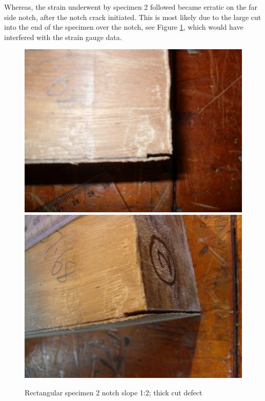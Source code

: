 \documentclass[11pt,a4paper]{article}
\numberwithin{equation}{subsection}
\begin{document}
\noindent
Whereas, the strain underwent by specimen 2 followed became erratic on the far side notch, after the notch crack initiated. This is most likely due to the large cut into the end of the specimen over the notch, see Figure \ref{fig:Rect_Cut}, which would have interfered with the strain gauge data. 

\vspace*{\baselineskip}

\begin{figure}[h]
	\begin{center}
		\includegraphics[scale=0.065]{Cut_Top}
		\includegraphics[scale=0.065]{Cut_Side}
	\end{center}
	\caption{Rectangular specimen 2 notch slope 1:2; thick cut defect}
	\label{fig:Rect_Cut}
\end{figure}
\pagebreak
\end{document}
